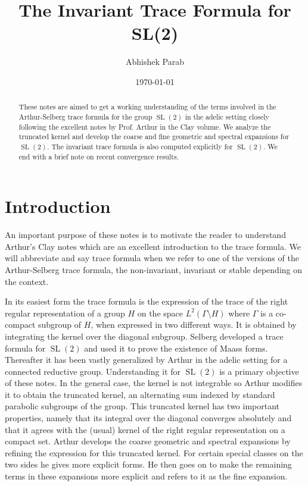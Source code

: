 \documentclass[11pt]{amsart}
\def\bs{\setminus}
\def\Ltwo{L^2}
\def\sl{\operatorname{SL}}
\theoremstyle{remark}
\begin{document}
\title{The Invariant Trace Formula for SL(2)}
\author{Abhishek Parab}
\date{\today}                       %

\maketitle
\setcounter{tocdepth}{1}		%

\begin{abstract}
	These notes are aimed to get a working understanding of the terms involved in the Arthur-Selberg trace formula for the group $\sl(2)$ in the adelic setting closely following the excellent notes \cite{clay} by Prof. Arthur in the Clay volume. We analyze the truncated kernel and develop the coarse and fine geometric and spectral expansions for $\sl(2)$. The invariant trace formula is also computed explicitly for $\sl(2)$. We end with a brief note on recent convergence results. 
\end{abstract}

\tableofcontents

\section{Introduction} \label{sec_intro}
	
	An important purpose of these notes is to motivate the reader to understand Arthur's Clay notes \cite{clay} which are an excellent introduction to the trace formula. We will abbreviate and say trace formula when we refer to one of the versions of the Arthur-Selberg trace formula, the non-invariant, invariant or stable depending on the context. 
	
	In its easiest form the trace formula is the expression of the trace of the right regular representation of a group $H$ on the space $\Ltwo(\Gamma\bs H)$ where $\Gamma$ is a co-compact subgroup of $H$, when expressed in two different ways. It is obtained by integrating the kernel over the diagonal subgroup. Selberg developed a trace formula for $\sl(2)$ and used it to prove the existence of Maass forms. Thereafter it has been vastly generalized by Arthur in the adelic setting for a connected reductive group. Understanding it for $\sl(2)$ is a primary objective of these notes. In the general case, the kernel is not integrable so Arthur modifies it to obtain the truncated kernel, an alternating sum indexed by standard parabolic subgroups of the group. This truncated kernel has two important properties, namely that its integral over the diagonal converges absolutely and that it agrees with the (usual) kernel of the right regular representation on a compact set. Arthur develops the coarse geometric and spectral expansions by refining the expression for this truncated kernel. For certain special classes on the two sides he gives more explicit forms. He then goes on to make the remaining terms in these expansions more explicit and refers to it as the fine expansion. 
	
\end{document}
